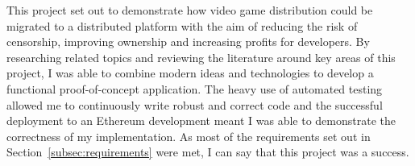 
This project set out to demonstrate how video game distribution could be migrated to a distributed platform with the aim of reducing the risk of censorship, improving ownership and increasing profits for developers.
\x
By researching related topics and reviewing the literature around key areas of this project, I was able to combine modern ideas and technologies to develop a functional proof-of-concept application. The heavy use of automated testing allowed me to continuously write robust and correct code and the successful deployment to an Ethereum development meant I was able to demonstrate the correctness of my implementation.
\x
As most of the requirements set out in Section~\ref{subsec:requirements} were met, I can say that this project was a success.